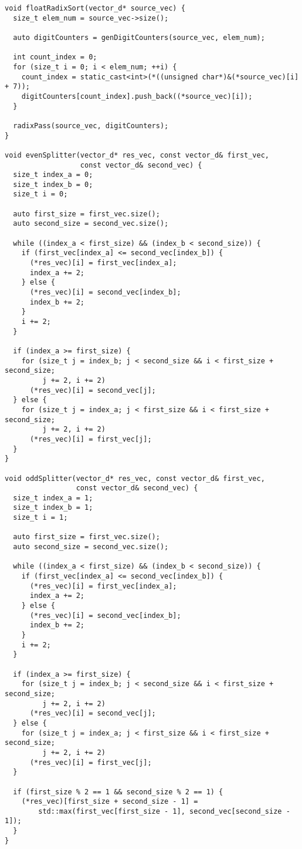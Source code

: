 \documentclass{report}
\begin{document}
\begin{lstlisting}
void floatRadixSort(vector_d* source_vec) {
  size_t elem_num = source_vec->size();

  auto digitCounters = genDigitCounters(source_vec, elem_num);

  int count_index = 0;
  for (size_t i = 0; i < elem_num; ++i) {
    count_index = static_cast<int>(*((unsigned char*)&(*source_vec)[i] + 7));
    digitCounters[count_index].push_back((*source_vec)[i]);
  }

  radixPass(source_vec, digitCounters);
}

void evenSplitter(vector_d* res_vec, const vector_d& first_vec,
                  const vector_d& second_vec) {
  size_t index_a = 0;
  size_t index_b = 0;
  size_t i = 0;

  auto first_size = first_vec.size();
  auto second_size = second_vec.size();

  while ((index_a < first_size) && (index_b < second_size)) {
    if (first_vec[index_a] <= second_vec[index_b]) {
      (*res_vec)[i] = first_vec[index_a];
      index_a += 2;
    } else {
      (*res_vec)[i] = second_vec[index_b];
      index_b += 2;
    }
    i += 2;
  }

  if (index_a >= first_size) {
    for (size_t j = index_b; j < second_size && i < first_size + second_size;
         j += 2, i += 2)
      (*res_vec)[i] = second_vec[j];
  } else {
    for (size_t j = index_a; j < first_size && i < first_size + second_size;
         j += 2, i += 2)
      (*res_vec)[i] = first_vec[j];
  }
}

void oddSplitter(vector_d* res_vec, const vector_d& first_vec,
                 const vector_d& second_vec) {
  size_t index_a = 1;
  size_t index_b = 1;
  size_t i = 1;

  auto first_size = first_vec.size();
  auto second_size = second_vec.size();

  while ((index_a < first_size) && (index_b < second_size)) {
    if (first_vec[index_a] <= second_vec[index_b]) {
      (*res_vec)[i] = first_vec[index_a];
      index_a += 2;
    } else {
      (*res_vec)[i] = second_vec[index_b];
      index_b += 2;
    }
    i += 2;
  }

  if (index_a >= first_size) {
    for (size_t j = index_b; j < second_size && i < first_size + second_size;
         j += 2, i += 2)
      (*res_vec)[i] = second_vec[j];
  } else {
    for (size_t j = index_a; j < first_size && i < first_size + second_size;
         j += 2, i += 2)
      (*res_vec)[i] = first_vec[j];
  }

  if (first_size % 2 == 1 && second_size % 2 == 1) {
    (*res_vec)[first_size + second_size - 1] =
        std::max(first_vec[first_size - 1], second_vec[second_size - 1]);
  }
}


\end{lstlisting}
\end{document}

